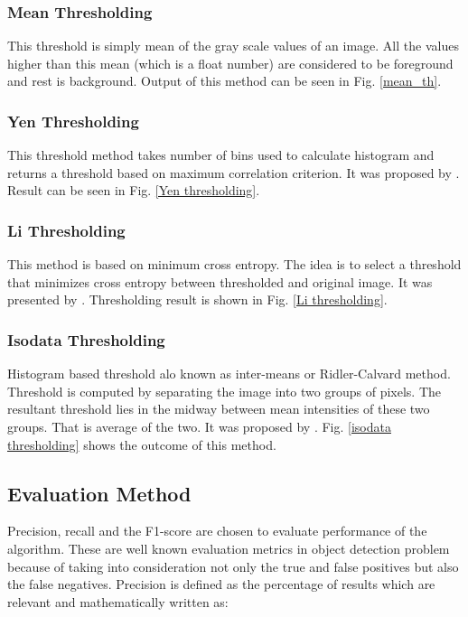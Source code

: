 \documentclass[11pt]{article}
\begin{document}
\subsubsection{Mean Thresholding}
This threshold is simply mean of the gray scale values of an image. All the values higher than this mean (which is a float number) are considered to be foreground and rest is background. Output of this method can be seen in Fig. \ref{mean_th}.

\subsubsection{Yen Thresholding}
This threshold method takes number of bins used to calculate histogram and returns a threshold based on maximum correlation criterion. It was proposed by \cite{yen1995new}. Result can be seen in Fig. \ref{Yen thresholding}.

\subsubsection{Li Thresholding}
This method is based on minimum cross entropy. The idea is to select a threshold that minimizes cross entropy between thresholded and original image. It was presented by \cite{li1993minimum}. Thresholding result is shown in Fig. \ref{Li thresholding}.

\subsubsection{Isodata Thresholding}
Histogram based threshold alo known as inter-means or Ridler-Calvard method. Threshold is computed by separating the image into two groups of pixels. The resultant threshold lies in the midway between mean intensities of these two groups. That is average of the two. It was proposed by \cite{ridler1978picture}. Fig. \ref{isodata thresholding} shows the outcome of this method.

\subsection{Evaluation Method}
Precision, recall and the F1-score are chosen to evaluate performance of the algorithm. These are well known evaluation metrics in object detection problem because of taking into consideration not only the true and false positives but also the false negatives. Precision is defined as the percentage of results which are relevant and mathematically written as:
\end{document}
